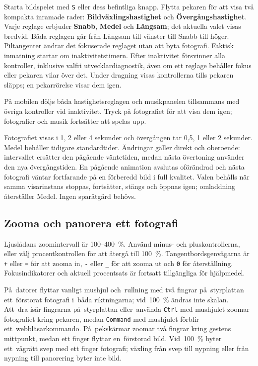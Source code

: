 \documentclass[11pt,a4paper]{article}
\newcommand{\ui}[1]{\textbf{#1}}
\newcommand{\codeword}[1]{\nolinkurl{#1}}
\begin{document}
Starta bildspelet med \codeword{S} eller dess befintliga knapp. Flytta pekaren
för att visa två kompakta inramade rader: \ui{Bildväxlingshastighet} och
\ui{Övergångshastighet}. Varje reglage erbjuder \ui{Snabb}, \ui{Medel} och
\ui{Långsam}; det aktuella valet visas bredvid. Båda reglagen går från Långsam
till vänster till Snabb till höger. Piltangenter ändrar det fokuserade reglaget
utan att byta fotografi. Faktisk inmatning startar om inaktivitetstimern. Efter
inaktivitet försvinner alla kontroller, inklusive valfri utvecklardiagnostik,
även om ett reglage behåller fokus eller pekaren vilar över det. Under dragning
visas kontrollerna tills pekaren släpps; en pekarrörelse visar dem igen.

På mobilen döljs båda hastighetsreglagen och musikpanelen tillsammans med
övriga kontroller vid inaktivitet. Tryck på fotografiet för att visa dem igen;
fotografier och musik fortsätter att spelas upp.

Fotografiet visas i 1, 2 eller 4 sekunder och övergången tar 0,5, 1 eller 2
sekunder. Medel behåller tidigare standardtider. Ändringar gäller direkt och
oberoende: intervallet ersätter den pågående väntetiden, medan nästa övertoning
använder den nya övergångstiden. En pågående animation avslutas oförändrad och
nästa fotografi väntar fortfarande på en förberedd bild i full kvalitet. Valen
behålls när samma visarinstans stoppas, fortsätter, stängs och öppnas igen;
omladdning återställer Medel. Ingen sparåtgärd behövs.

\subsection{Zooma och panorera ett fotografi}

Ljuslådans zoomintervall är 100--400~\%. Använd minus- och pluskontrollerna,
eller välj procentkontrollen för att återgå till 100~\%. Tangentbordsgenvägarna
är \codeword{+} eller \codeword{=} för att zooma in, \codeword{-} eller
\codeword{\_} för att zooma ut och \codeword{0} för återställning.
Fokusindikatorer och aktuell procentsats är fortsatt tillgängliga för
hjälpmedel.

På~datorer flyttar vanligt mushjul och~rullning med två fingrar på~styrplattan
ett~förstorat fotografi i~båda riktningarna; vid~100~\% ändras inte skalan.
Att~dra isär fingrarna på~styrplattan eller~använda \codeword{Ctrl} med
mushjulet zoomar fotografiet kring pekaren, medan \codeword{Command} med
mushjulet förblir ett~webbläsarkommando. På~pekskärmar zoomar två fingrar kring
gestens mittpunkt, medan ett finger flyttar en~förstorad bild. Vid~100~\% byter
ett~vågrätt svep med ett finger fotografi; växling från svep till nypning eller
från nypning till panorering byter inte bild.
\end{document}
